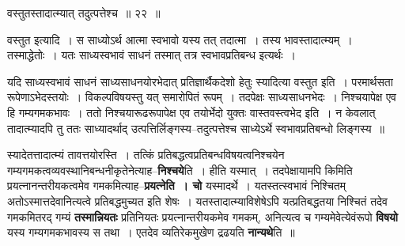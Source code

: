 \documentclass[article,12pt,a4paper]{memoir}
\begin{document}
	  \bigskip
	  \begingroup
	

	  \pstart {}वस्तुतस्तादात्म्यात् तदुत्पत्तेश्च ॥ २२ ॥
	\pend
      
	  \endgroup
	 

	  \pstart वस्तुत इत्यादि । स साध्योऽर्थ आत्मा स्वभावो यस्य तत् तदात्मा । तस्य भावस्तादात्म्यम् । तस्माद्धेतोः । यतः साध्यस्वभावं साधनं तस्मात् तत्र स्वभावप्रतिबन्ध इत्यर्थः ।
	\pend
        

	  \pstart यदि साध्यस्वभावं साधनं साध्यसाधनयोरभेदात् प्रतिज्ञार्थैकदेशो हेतुः स्यादित्या वस्तुत इति । परमार्थसता रूपेणाऽभेदस्तयोः । विकल्पविषयस्तु यत् समारोपितं रूपम् । तदपेक्षः साध्यसाधनभेदः । निश्चयापेक्ष एव हि गम्यगमकभावः । ततो निश्चयारूढरूपापेक्ष एव तयोर्भेदो युक्तः वास्तवस्त्वभेद इति । न केवलात् तादात्म्यादपि तु ततः साध्यादर्थाद् उत्पत्तिर्लिङ्गस्य--तदुत्पत्तेश्च साध्येऽर्थे स्वभावप्रतिबन्धो लिङ्गस्य ॥
	\pend
      
	  \endgroup
	

	  \pstart स्यादेतत्तादात्म्यं तावत्तयोरस्ति । तत्किं प्रतिबद्धत्वप्रतिबन्धविषयत्वनिश्चयेन गम्यगमकत्वव्यवस्थानिबन्धनीकृतेनेत्याह--\textbf{निश्चये}ति । हीति यस्मात् । तदपेक्षायामपि किमिति प्रयत्नानन्तरीयकत्वमेव गमकमित्याह--\textbf{प्रयत्नेति । चो} यस्मादर्थे । यतस्तत्स्वभावं निश्चितम् अतोऽस्मात्तदेवानित्यत्वे प्रतिबद्धमुच्यत इति शेषः । यतस्तादात्म्याविशेषेऽपि यत्प्रतिबद्धतया निश्चितं तदेव गमकमितरद् गम्यं \textbf{तस्मान्नियतः} प्रतिनियतः प्रयत्नान्तरीयकमेव गमकम्, अनित्यत्व च गम्यमेवेत्येवंरूपो \textbf{विषयो} यस्य गम्यगमकभावस्य स तथा । एतदेव व्यतिरेकमुखेण द्रढयति \textbf{नान्यथे}ति ॥
	\pend
      
\end{document}
